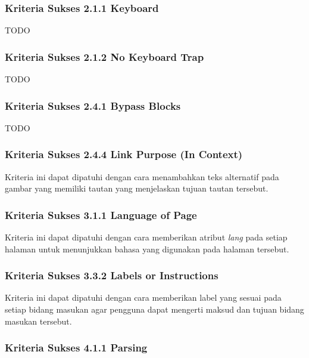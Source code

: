 \subsubsection{Kriteria Sukses 2.1.1 Keyboard}
\label{subsubsec:peningkatan_A_2.1.1}
TODO

\subsubsection{Kriteria Sukses 2.1.2 No Keyboard Trap}
\label{subsubsec:peningkatan_A_2.1.2}
TODO

\subsubsection{Kriteria Sukses 2.4.1 Bypass Blocks}
\label{subsubsec:peningkatan_A_2.4.1}
TODO

\subsubsection{Kriteria Sukses 2.4.4 Link Purpose (In Context)}
\label{subsubsec:peningkatan_A_2.4.4}

Kriteria ini dapat dipatuhi dengan cara menambahkan teks alternatif pada gambar yang memiliki tautan yang menjelaskan tujuan tautan tersebut.

\subsubsection{Kriteria Sukses 3.1.1 Language of Page}
\label{subsubsec:peningkatan_A_3.1.1}

Kriteria ini dapat dipatuhi dengan cara memberikan atribut \textit{lang} pada setiap halaman untuk menunjukkan bahasa yang digunakan pada halaman tersebut.

\subsubsection{Kriteria Sukses 3.3.2 Labels or Instructions}
\label{subsubsec:peningkatan_A_3.3.2}

Kriteria ini dapat dipatuhi dengan cara memberikan label yang sesuai pada setiap bidang masukan agar pengguna dapat mengerti maksud dan tujuan bidang masukan tersebut.

\subsubsection{Kriteria Sukses 4.1.1 Parsing}
\label{subsubsec:peningkatan_A_4.1.1}

